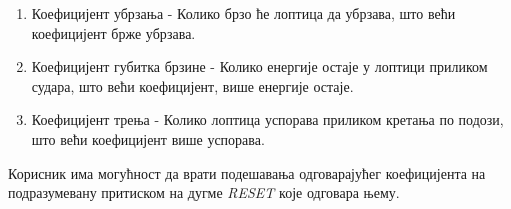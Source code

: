 \begin{enumerate}
\item Коефицијент убрзања - Колико брзо ће лоптица да убрзава, што већи коефицијент брже убрзава.
\item Коефицијент губитка брзине - Колико енергије остаје у лоптици приликом судара, што већи коефицијент, више енергије остаје.
\item Коефицијент трења - Колико лоптица успорава приликом кретања по подози, што већи коефицијент више успорава.
\end{enumerate}
Корисник има могућност да врати подешавања одговарајућег коефицијента на подразумевану притиском на дугме \emph{RESET} које одговара њему. 



